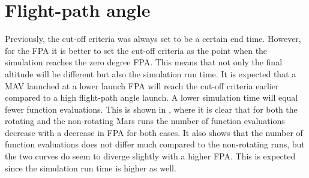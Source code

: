 \section{Flight-path angle}
\label{sec:flightPathAngle}
Previously, the cut-off criteria was always set to be a certain end time. However, for the \ac{FPA} it is better to set the cut-off criteria as the point when the simulation reaches the zero degree \ac{FPA}. This means that not only the final altitude will be different but also the simulation run time. It is expected that a \ac{MAV} launched at a lower launch \ac{FPA} will reach the cut-off criteria earlier compared to a high flight-path angle launch. A lower simulation time will equal fewer function evaluations. This is shown in , where it is clear that for both the rotating and the non-rotating Mars runs the number of function evaluations decrease with a decrease in \ac{FPA} for both cases. It also shows that the number of function evaluations does not differ much compared to the non-rotating runs, but the two curves do seem to diverge slightly with a higher \ac{FPA}. This is expected since the simulation run time is higher as well.  





%




